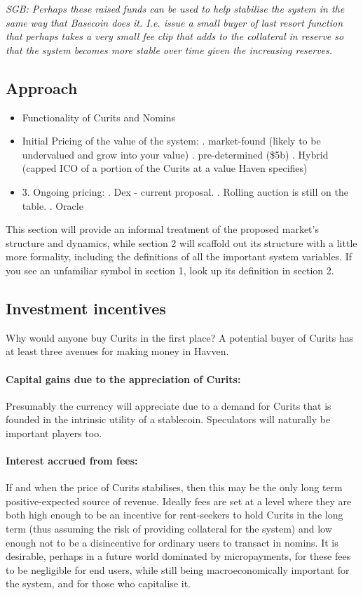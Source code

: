 \documentclass{article}
\begin{document}
\noindent \textit{SGB: Perhaps these raised funds can be used to help stabilise the system in the same way that Basecoin does it. I.e. issue a small buyer of last resort function that perhaps takes a very small fee clip that adds to the collateral in reserve so that the system becomes more stable over time given the increasing reserves.}

\subsection{Approach}

\begin{itemize}
	\item Functionality of Curits and Nomins
	\item Initial Pricing of the value of the system:
		. market-found (likely to be undervalued and grow into your value)
		. pre-determined (\$5b)
		. Hybrid (capped ICO of a portion of the Curits at a value Haven specifies)
	\item 3. Ongoing pricing:
		. Dex - current proposal.
		. Rolling auction is still on the table.
		. Oracle
\end{itemize}

This section will provide an informal treatment of the proposed market's structure and dynamics, while section 2 will scaffold out its structure with a little more formality, including the definitions of all the important system variables. If you see an unfamiliar symbol in section 1, look up its definition in section 2.

\subsection{Investment incentives}

Why would anyone buy Curits in the first place? A potential buyer of Curits has at least three avenues for making money in Havven.

\paragraph{Capital gains due to the appreciation of Curits:}
Presumably the currency will appreciate due to a demand for Curits that is founded in the intrinsic utility of a stablecoin. Speculators will naturally be important players too.

\paragraph{Interest accrued from fees:}
If and when the price of Curits stabilises, then this may be the only long term positive-expected source of revenue. Ideally fees are set at a level where they are both high enough to be an incentive for rent-seekers to hold Curits in the long term (thus assuming the risk of providing collateral for the system) and low enough not to be a disincentive for ordinary users to transact in nomins.
It is desirable, perhaps in a future world dominated by micropayments, for these fees to be negligible for end users, while still being macroeconomically important for the system, and for those who capitalise it.
\end{document}
